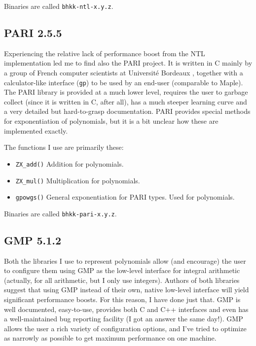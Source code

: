 \documentclass[a4paper]{article}
\newcommand{\code}{\texttt}
\begin{document}
Binaries are called \code{bhkk-ntl-x.y.z}.

\subsection{PARI 2.5.5}
Experiencing the relative lack of performance boost from the NTL implementation led me to find also the PARI project. It is written in C mainly by a group of French computer scientists at Université Bordeaux \cite{pari}, together with a calculator-like interface (\code{gp}) to be used by an end-user (comparable to Maple). The PARI library is provided at a much lower level, requires the user to garbage collect (since it is written in C, after all), has a much steeper learning curve and a very detailed but hard-to-grasp documentation. PARI provides special methods for exponentiation of polynomials, but it is a bit unclear how these are implemented exactly.

The functions I use are primarily these: 

\begin{itemize}
 \item \code{ZX\_add()}
 \subitem Addition for polynomials. %
 \item \code{ZX\_mul()}
 \subitem Multiplication for polynomials. %
 \item \code{gpowgs()}
 \subitem General exponentiation for PARI types. Used for polynomials.
\end{itemize}

Binaries are called \code{bhkk-pari-x.y.z}.



\subsection{GMP 5.1.2}
Both the libraries I use to represent polynomials allow (and encourage) the user to configure them using GMP\cite{gmp} as the low-level interface for integral arithmetic (actually, for all arithmetic, but I only use integers). Authors of both libraries suggest that using GMP instead of their own, native low-level interface will yield significant performance boosts. For this reason, I have done just that. GMP is well documented, easy-to-use, provides both C and C++ interfaces and even has a well-maintained bug reporting facility (I got an answer the same day!). GMP allows the user a rich variety of configuration options, and I've tried to optimize as narrowly as possible to get maximum performance on one machine.
\end{document}
